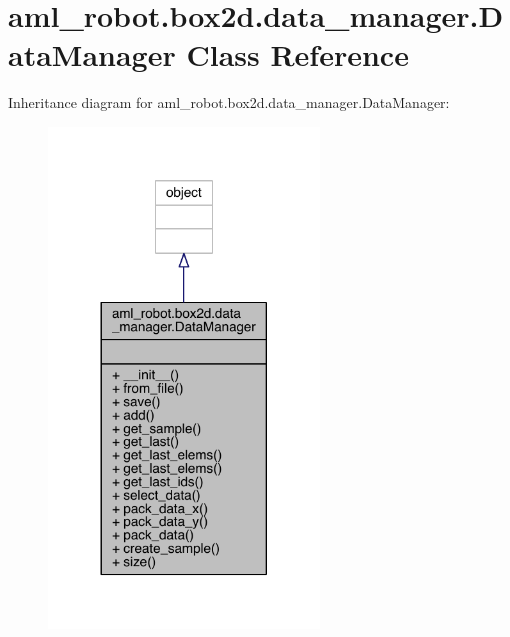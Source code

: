 \hypertarget{classaml__robot_1_1box2d_1_1data__manager_1_1_data_manager}{}\section{aml\+\_\+robot.\+box2d.\+data\+\_\+manager.\+Data\+Manager Class Reference}
\label{classaml__robot_1_1box2d_1_1data__manager_1_1_data_manager}


Inheritance diagram for aml\+\_\+robot.\+box2d.\+data\+\_\+manager.\+Data\+Manager\+:\nopagebreak
\begin{figure}[H]
\begin{center}
\leavevmode
\includegraphics[width=204pt]{classaml__robot_1_1box2d_1_1data__manager_1_1_data_manager__inherit__graph}
\end{center}
\end{figure}


